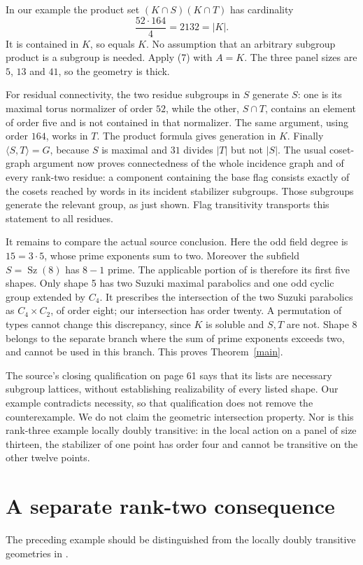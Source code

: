 \documentclass[11pt,a4paper]{article}
\newcommand{\Sz}{\operatorname{Sz}}
\newcommand{\gen}[1]{\langle #1\rangle}
\begin{document}
In our example the product set $(K\cap S)(K\cap T)$ has cardinality
\[
                         \frac{52\cdot164}{4}=2132=|K|.
\]
It is contained in $K$, so equals $K$. No assumption that an arbitrary
subgroup product is a subgroup is needed. Apply (7) with $A=K$.
The three panel sizes are $5$, $13$ and $41$, so the geometry is thick.

For residual connectivity, the two residue subgroups in $S$ generate
$S$: one is its maximal torus normalizer of order $52$, while the
other, $S\cap T$, contains an element of order five and is not contained
in that normalizer. The same argument, using order $164$, works in $T$.
The product formula gives generation in $K$. Finally $\gen{S,T}=G$,
because $S$ is maximal and $31$ divides $|T|$ but not $|S|$.
The usual coset-graph argument now proves connectedness of the whole
incidence graph and of every rank-two residue: a component containing
the base flag consists exactly of the cosets reached by words in its
incident stabilizer subgroups. Those subgroups generate the relevant
group, as just shown. Flag transitivity transports this statement to
all residues.

It remains to compare the actual source conclusion. Here the odd field
degree is $15=3\cdot5$, whose prime exponents sum to two. Moreover
the subfield $S=\Sz(8)$ has $8-1$ prime. The applicable portion of
\cite[Theorem 5.5, printed pp.58--59]{source} is therefore its first
five shapes. Only shape 5 has two Suzuki maximal parabolics and one
odd cyclic group extended by $C_4$. It prescribes the intersection of
the two Suzuki parabolics as $C_4\times C_2$, of order eight; our
intersection has order twenty. A permutation of types cannot change
this discrepancy, since $K$ is soluble and $S,T$ are not. Shape 8
belongs to the separate branch where the sum of prime exponents
exceeds two, and cannot be used in this branch. This proves
Theorem~\ref{main}.

The source's closing qualification on page 61 says that its lists are
necessary subgroup lattices, without establishing realizability of every
listed shape. Our example contradicts necessity, so that qualification
does not remove the counterexample. We do not claim the geometric
intersection property. Nor is this rank-three example locally doubly
transitive: in the local action on a panel of size thirteen, the
stabilizer of one point has order four and cannot be transitive
on the other twelve points.

\section{A separate rank-two consequence}
The preceding example should be distinguished from the locally doubly
transitive geometries in \cite{scalars}.
\end{document}
